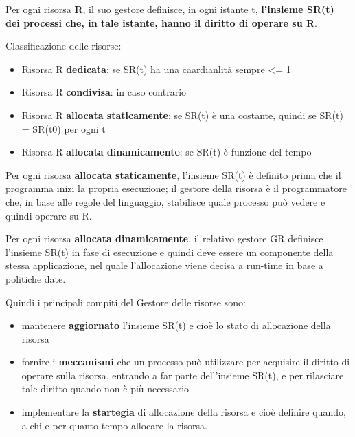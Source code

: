 \documentclass{article}
\begin{document}
Per ogni risorsa \textbf{R}, il suo gestore definisce, in ogni istante t, \textbf{l'insieme SR(t) dei processi che, in tale istante, hanno il diritto di operare su R}.

\vspace{5mm}

Classificazione delle risorse:
\begin{itemize}
    \item Risorsa R \textbf{dedicata}: se SR(t) ha una caardianlità sempre <= 1
    \item Risorsa R \textbf{condivisa}: in caso contrario
    \item Risorsa R \textbf{allocata staticamente}: se SR(t) è una costante, quindi se SR(t) = SR(t0) per ogni t
    \item Risorsa R \textbf{allocata dinamicamente}: se SR(t) è funzione del tempo
\end{itemize}

Per ogni risorsa \textbf{allocata staticamente}, l'insieme SR(t) è definito prima che il programma inizi la propria esecuzione; il gestore della risorsa è il programmatore che,
in base alle regole del linguaggio, stabilisce quale processo può vedere e quindi operare su R.

Per ogni risorsa \textbf{allocata dinamicamente}, il relativo gestore GR definisce l'insieme SR(t) in fase di esecuzione e quindi deve essere un componente della stessa applicazione,
nel quale l'allocazione viene decisa a run-time in base a politiche date.

\vspace{5mm}
Quindi i principali compiti del Gestore delle risorse sono:
\begin{itemize}
    \item mantenere \textbf{aggiornato} l'insieme SR(t) e cioè lo stato di allocazione della risorsa
    \item fornire i \textbf{meccanismi} che un processo può utilizzare per acquisire il diritto di operare sulla risorsa, entrando a far parte dell'insieme SR(t), e per rilasciare
    tale diritto quando non è più necessario
    \item implementare la \textbf{startegia} di allocazione della risorsa e cioè definire quando, a chi e per quanto tempo allocare la risorsa.
\end{itemize}
\end{document}
